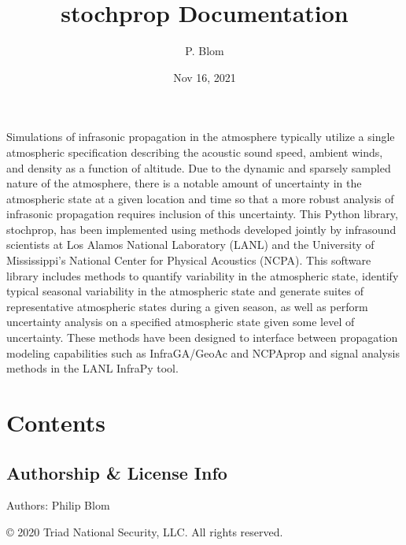 \documentclass[letterpaper,10pt,english]{sphinxmanual}
\title{stochprop Documentation}
\date{Nov 16, 2021}
\author{P. Blom}
\begin{document}
\pagestyle{empty}
\sphinxmaketitle
\pagestyle{plain}
\sphinxtableofcontents
\pagestyle{normal}
\label{\detokenize{index::doc}}


\sphinxAtStartPar
Simulations of infrasonic propagation in the atmosphere typically utilize a single atmospheric specification describing the acoustic sound speed, ambient winds, and density as a function of altitude.  Due to the dynamic and sparsely sampled nature of the atmosphere, there is a notable amount of uncertainty in the atmospheric state at a given location and time so that a more robust analysis of infrasonic propagation requires inclusion of this uncertainty.  This Python library, stochprop, has been implemented using methods developed jointly by infrasound scientists at Los Alamos National Laboratory (LANL) and the University of Mississippi’s National Center for Physical Acoustics (NCPA).  This software library includes methods to quantify variability in the atmospheric state, identify typical seasonal variability in the atmospheric state and generate suites of representative atmospheric states during a given season, as well as perform uncertainty analysis on a specified atmospheric state given some level of uncertainty.  These methods have been designed to interface between propagation modeling capabilities such as InfraGA/GeoAc and NCPAprop and signal analysis methods in the LANL InfraPy tool.


\chapter{Contents}
\label{\detokenize{index:module-stochprop}}\label{\detokenize{index:contents}}

\section{Authorship \& License Info}
\label{\detokenize{authorship:authorship-license-info}}\label{\detokenize{authorship:authorship}}\label{\detokenize{authorship::doc}}
\sphinxAtStartPar
Authors: Philip Blom

\sphinxAtStartPar
© 2020 Triad National Security, LLC. All rights reserved.
\end{document}
